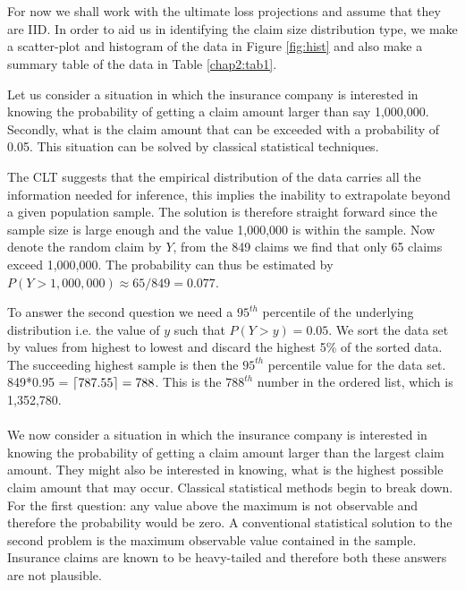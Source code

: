 \begin{table}[h]
\centering
{}\caption{Summary of the ultimates data}
\label{chap2:tab1}
\end{table}
\\\\
For now we shall work with the ultimate loss projections and assume that they are IID. In order to aid us in identifying the claim size distribution type, we make a scatter-plot and histogram of the data in Figure \ref{fig:hist} and also make a summary table of the data in Table \ref{chap2:tab1}. 

Let us consider a situation in which the insurance company is interested in knowing the probability of getting a claim amount larger than say 1,000,000. Secondly, what is the claim amount that can be exceeded with a probability of 0.05. This situation can be solved by classical statistical techniques.

The CLT suggests that the empirical distribution of the data carries all the information needed for inference, this implies the inability to extrapolate beyond a given population sample. The solution is therefore straight forward since the sample size is large enough and the value 1,000,000 is within the sample. Now denote the random claim by $Y$, from the 849 claims we find that only 65 claims exceed 1,000,000. The probability can thus be estimated by $P(Y>1,000,000) \approx 65/849 = 0.077$.

To answer the second question we need a $95^{th}$ percentile of the underlying distribution i.e. the value of $y$ such that $P(Y>y) = 0.05$. We sort the data set by values from highest to lowest and discard the highest 5\% of the sorted data. The succeeding highest sample is then the $95^{th}$ percentile value for the data set. 849*0.95 = $\lceil787.55\rceil = 788$. This is the $788^{th}$ number in the ordered list, which is 1,352,780.
\\\\
We now consider a situation in which the insurance company is interested in knowing the probability of getting a claim amount larger than the largest claim amount. They might also be interested in knowing, what is the highest possible claim amount that may occur. Classical statistical methods begin to break down. For the first question: any value above the maximum is not observable and therefore the probability would be zero. A conventional statistical solution to the second problem is the maximum observable value contained in the sample. Insurance claims are known to be heavy-tailed and therefore both these answers are not plausible.

